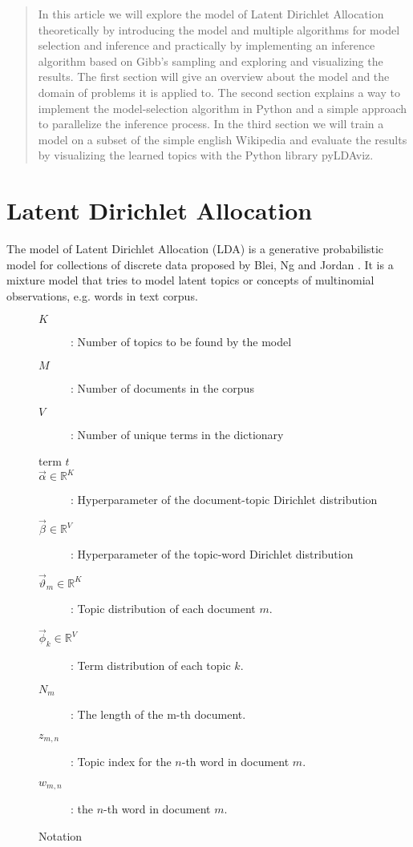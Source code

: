 \documentclass[12 pt,twopage]{article}
\begin{document}
\begin{abstract}

 In this article we will explore the model of Latent Dirichlet Allocation theoretically by introducing the model and multiple algorithms for model selection and inference and practically by implementing an inference algorithm based on Gibb's sampling and exploring and visualizing the results.
 The first section will give an overview about the model and the domain of problems it is applied to.
 The second section explains a way to implement the model-selection algorithm in Python and a simple approach to parallelize the inference process.
 In the third section we will train a model on a subset of the simple english Wikipedia and evaluate the results by visualizing the learned topics with the Python library pyLDAviz.
\end{abstract}
\section{Latent Dirichlet Allocation}
The model of Latent Dirichlet Allocation (LDA) is a generative probabilistic model for collections of discrete data proposed by Blei, Ng and Jordan \cite{Blei2003}. It is a mixture model that tries to model latent topics or concepts of multinomial observations, e.g. words in text corpus.
\begin{figure}[h]
 \begin{center}
  \begin{footnotesize}
   \begin{description}
    \item[\( K \)] : Number of topics to be found by the model
    \item[\( M \)] : Number of documents in the corpus
    \item[\( V \)] : Number of unique terms in the dictionary
    \item[ term \(t\)] 
    \item[\( \vec\alpha \in \mathbb{R}^K \)] : Hyperparameter of the document-topic Dirichlet distribution
    \item[\( \vec\beta \in \mathbb{R}^V \)] : Hyperparameter of the topic-word Dirichlet distribution
    \item[\( \vec\vartheta_m \in \mathbb{R}^K \)] : Topic distribution of each document \(m\).
    \item[\( \vec\phi_k \in \mathbb{R}^V \)] : Term distribution of each topic \(k\).
    \item[\( N_m \)] : The length of the m-th document.
    \item[\( z_{m,n} \)] : Topic index for the \(n\)-th word in document \(m\).
    \item[\( w_{m,n} \)] : the \(n\)-th word in document \(m\).
   \end{description}
  \end{footnotesize}
 \end{center}
 \caption{Notation}
 \label{fig:notation}
\end{figure}
\end{document}
